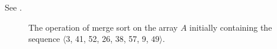 See .
\begin{figure}[htb]
    
    \caption{The operation of merge sort on the array $A$ initially containing the sequence $\langle3$, 41, 52, 26, 38, 57, 9, $49\rangle$.} \label{fig:2.3-1}
\end{figure}
